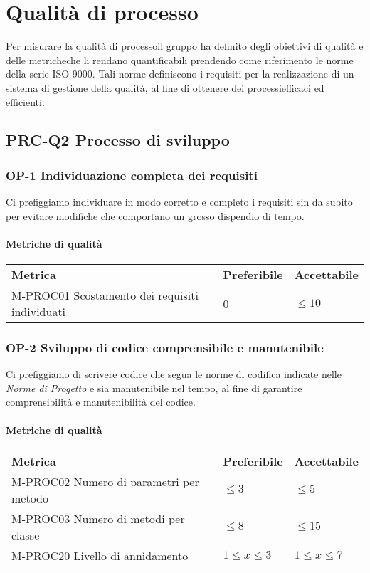 \section{Qualità di processo}
Per misurare la qualità di processo\glosp il gruppo ha definito degli obiettivi di qualità e delle metriche\glosp che li rendano quantificabili prendendo come riferimento le norme della serie ISO 9000. Tali norme definiscono i requisiti per la realizzazione di un sistema di gestione della qualità, al fine di ottenere dei processi\glosp efficaci ed efficienti.
	\subsection{PRC-Q2 Processo di sviluppo}
		\subsubsection{OP-1 Individuazione completa dei requisiti} 
			Ci prefiggiamo individuare in modo corretto e completo i requisiti sin da subito per evitare modifiche che comportano un grosso dispendio di tempo.
			\paragraph{Metriche di qualità} \mbox{}
			\begin{longtable} {
					>{}p{80mm} 
					>{}p{25mm}
					>{}p{25mm}
				}
				\rowcolor{gray!50}
				\textbf{Metrica} & \textbf{Preferibile} & \textbf{Accettabile} \TBstrut \TBstrut \\
				M-PROC01 Scostamento dei requisiti individuati & 0 & $\le 10$ \TBstrut \\ [2mm]
			\end{longtable}
			
		\subsubsection{OP-2 Sviluppo di codice comprensibile e manutenibile}
			Ci prefiggiamo di scrivere codice che segua le norme di codifica indicate nelle \textit{Norme di Progetto} e sia manutenibile nel tempo, al fine di garantire comprensibilità e manutenibilità del codice.
			\paragraph{Metriche di qualità} \mbox{}
			\begin{longtable} {
					>{}p{80mm} 
					>{}p{25mm}
					>{}p{25mm}
				}
				\rowcolor{gray!50}
				\textbf{Metrica} & \textbf{Preferibile} & \textbf{Accettabile} \TBstrut \TBstrut \\
				M-PROC02 Numero di parametri per metodo & $ \le 3$ & $ \le 5$ \TBstrut \\ [2mm]
				M-PROC03 Numero di metodi per classe & $ \le 8$ & $ \le 15$ \TBstrut \\ [2mm]
				M-PROC20 Livello di annidamento & $1 \le x \le 3$ & $1 \le x \le 7$ \TBstrut \\ [2mm]
			\end{longtable}
	
